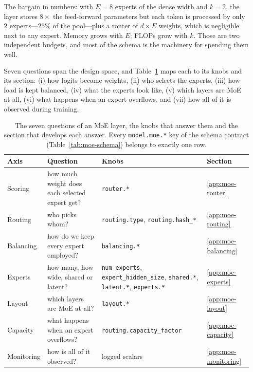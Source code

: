 The bargain in numbers: with $E = 8$ experts of the dense width and $k = 2$,
the layer stores $8\times$ the feed-forward parameters but each token is
processed by only $2$ experts---$25\%$ of the pool---plus a router of $d
\times E$ weights, which is negligible next to any expert. Memory grows with
$E$; FLOPs grow with $k$. Those are two independent budgets, and most of the
schema is the machinery for spending them well.

Seven questions span the design space, and Table~\ref{tab:moe-questions} maps
each to its knobs and its section: (i) how logits become weights, (ii) who
selects the experts, (iii) how load is kept balanced, (iv) what the experts
look like, (v) which layers are MoE at all, (vi) what happens when an expert
overflows, and (vii) how all of it is observed during training.

\begin{table}[H]
\centering
\caption{The seven questions of an MoE layer, the knobs that answer them and
the section that develops each answer. Every \texttt{model.moe.*} key of the
schema contract (Table~\ref{tab:moe-schema}) belongs to exactly one row.}
\label{tab:moe-questions}
\small
\begin{tabular}{@{}L{2.2cm}L{4.8cm}L{4.6cm}L{1.6cm}@{}}
\toprule
\textbf{Axis} & \textbf{Question} & \textbf{Knobs} & \textbf{Section} \\
\midrule
Scoring & how much weight does each selected expert get? & \texttt{router.*} & \ref{app:moe-router} \\
Routing & who picks whom? & \texttt{routing.type}, \texttt{routing.hash\_*} & \ref{app:moe-routing} \\
Balancing & how do we keep every expert employed? & \texttt{balancing.*} & \ref{app:moe-balancing} \\
Experts & how many, how wide, shared or latent? & \texttt{num\_experts}, \texttt{expert\_hidden\_size}, \texttt{shared.*}, \texttt{latent.*}, \texttt{experts.*} & \ref{app:moe-experts} \\
Layout & which layers are MoE at all? & \texttt{layout.*} & \ref{app:moe-layout} \\
Capacity & what happens when an expert overflows? & \texttt{routing.capacity\_factor} & \ref{app:moe-capacity} \\
Monitoring & how is all of it observed? & logged scalars & \ref{app:moe-monitoring} \\
\bottomrule
\end{tabular}
\end{table}

